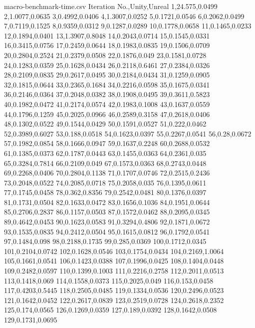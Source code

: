 \begin{filecontents*}{macro-benchmark-time.csv}
Iteration No.,Unity,Unreal
1,24.575,0.0499
2,1.0077,0.0635
3,0.4992,0.0406
4,1.3007,0.0252
5,0.1721,0.0546
6,0.2062,0.0499
7,0.7119,0.1525
8,0.9359,0.0312
9,0.1287,0.0289
10,0.1778,0.0658
11,0.1465,0.0233
12,0.1894,0.0401
13,1.3907,0.8048
14,0.2043,0.0714
15,0.1545,0.0331
16,0.3415,0.0756
17,0.2459,0.0644
18,0.1983,0.0835
19,0.1506,0.0709
20,0.2804,0.2524
21,0.2379,0.0508
22,0.1876,0.049
23,0.1581,0.0728
24,0.1283,0.0359
25,0.1628,0.0434
26,0.2118,0.6461
27,0.2384,0.0326
28,0.2109,0.0835
29,0.2617,0.0495
30,0.2184,0.0434
31,0.1259,0.0905
32,0.1815,0.0644
33,0.2365,0.1684
34,0.2216,0.0598
35,0.1675,0.0341
36,0.2146,0.0364
37,0.2048,0.0382
38,0.1908,0.0495
39,0.3611,0.5823
40,0.1982,0.0472
41,0.2174,0.0574
42,0.1983,0.1008
43,0.1637,0.0559
44,0.1796,0.1259
45,0.2025,0.0966
46,0.2589,0.3158
47,0.2618,0.0406
48,0.1302,0.0522
49,0.1544,0.0429
50,0.1591,0.0527
51,0.222,0.0462
52,0.3989,0.6027
53,0.188,0.0518
54,0.1623,0.0397
55,0.2267,0.0541
56,0.28,0.0672
57,0.1982,0.0854
58,0.1666,0.0947
59,0.1637,0.2248
60,0.2688,0.0532
61,0.1385,0.0373
62,0.1787,0.0443
63,0.1455,0.0363
64,0.2361,0.035
65,0.3284,0.7814
66,0.2109,0.049
67,0.1573,0.0363
68,0.2743,0.0448
69,0.2268,0.0406
70,0.2804,0.1138
71,0.1707,0.0746
72,0.2515,0.2436
73,0.2048,0.0522
74,0.2085,0.0718
75,0.2058,0.035
76,0.1395,0.0611
77,0.1745,0.0458
78,0.362,0.8356
79,0.2542,0.0481
80,0.1376,0.0397
81,0.1731,0.0504
82,0.1633,0.0472
83,0.1656,0.1036
84,0.1951,0.0644
85,0.2706,0.2837
86,0.1157,0.0503
87,0.1572,0.0462
88,0.2095,0.0345
89,0.4642,0.0453
90,0.1623,0.0583
91,0.3294,0.4806
92,0.1871,0.0672
93,0.1535,0.0835
94,0.2412,0.0504
95,0.1615,0.0812
96,0.1792,0.0541
97,0.1484,0.098
98,0.2188,0.1735
99,0.285,0.0369
100,0.1712,0.0345
101,0.2104,0.0742
102,0.1628,0.0546
103,0.1754,0.0434
104,0.2169,1.0064
105,0.1661,0.0541
106,0.1423,0.0388
107,0.1996,0.0425
108,0.1404,0.0448
109,0.2482,0.0597
110,0.1399,0.1003
111,0.2216,0.2758
112,0.2011,0.0513
113,0.1418,0.069
114,0.1558,0.0373
115,0.2025,0.049
116,0.153,0.0458
117,0.4203,0.5445
118,0.2505,0.0485
119,0.1334,0.0536
120,0.2496,0.0523
121,0.1642,0.0452
122,0.2617,0.0839
123,0.2519,0.0728
124,0.2618,0.2352
125,0.174,0.0565
126,0.1269,0.0359
127,0.189,0.0392
128,0.1642,0.0508
129,0.1731,0.0695
\end{filecontents*}
